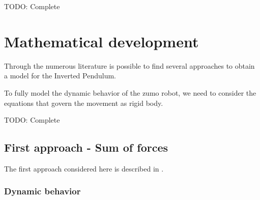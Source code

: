 \documentclass{article}
\begin{document}

TODO: Complete

\section{Mathematical development}

Through the numerous literature is possible to find several approaches to obtain a model for the Inverted Pendulum.

To fully model the dynamic behavior of the zumo robot, we need to consider the equations that govern the movement as rigid body.

TODO: Complete

\subsection{First approach - Sum of forces}

The first approach considered here is described in \cite{SUL03}.

\subsubsection{Dynamic behavior}
\end{document}
